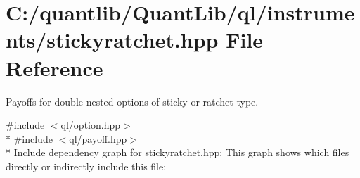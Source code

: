 \section{C\+:/quantlib/\+Quant\+Lib/ql/instruments/stickyratchet.hpp File Reference}
\label{stickyratchet_8hpp}


Payoffs for double nested options of sticky or ratchet type.  


{\ttfamily \#include $<$ql/option.\+hpp$>$}\\*
{\ttfamily \#include $<$ql/payoff.\+hpp$>$}\\*
Include dependency graph for stickyratchet.\+hpp\+:
This graph shows which files directly or indirectly include this file\+:
